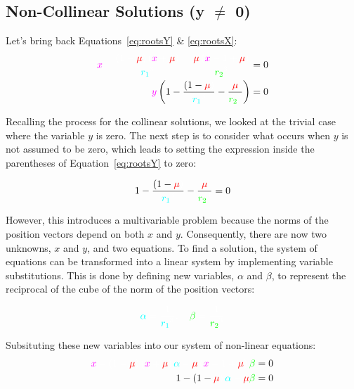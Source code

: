 \subsection{Non-Collinear Solutions \texorpdfstring{(y $\neq$ 0)}{}}

Let's bring back Equations~\eqref{eq:rootsY} \& \eqref{eq:rootsX}:
\begin{align*}
    \cm x \cw - \ddfrac{\left(1 - \cred \mu \cw \right) \left(\cm x \cw + \cred \mu \cw\right)}{\cc r_1 \cw ^3} - \ddfrac{\cred \mu \cw \left(\cm x \cw - 1 + \cred\mu\cw\right)}{\cg r_2 \cw ^3} & = 0
    \\
    \textcolor{magenta}{y} \left( 1 - \ddfrac{\left(1-\cred\mu\cw\right)}{\cc r_1 \cw ^3} - \ddfrac{\cred\mu\cw}{\cg r_2 \cw ^3} \right)                                                          & = 0
\end{align*}


Recalling the process for the collinear solutions, we looked at the trivial case where the variable $y$ is zero. The next step is to consider what occurs when $y$ is not assumed to be zero, which leads to setting the expression inside the parentheses of Equation~\eqref{eq:rootsY} to zero:

\begin{equation}
    1 - \ddfrac{\left(1-\cred\mu\cw\right)}{\cc r_1 \cw ^3} - \ddfrac{\cred\mu\cw}{\cg r_2 \cw ^3} = 0 \\
\end{equation}

However, this introduces a multivariable problem because the norms of the position vectors depend on both $x$ and $y$. Consequently, there are now two unknowns, $x$ and $y$, and two equations. To find a solution, the system of equations can be transformed into a linear system by implementing variable substitutions. This is done by defining new variables, $\alpha$ and $\beta$, to represent the reciprocal of the cube of the norm of the position vectors:

\begin{equation}
    \cc \alpha \cw = \ddfrac{1}{\cc r_1 \cw ^3}, \quad \cg \beta \cw = \ddfrac{1}{\cg r_2 \cw ^3}
\end{equation}

Subsituting these new variables into our system of non-linear equations:
\begin{align}
    \cm x \cw - \left(1 - \cred \mu \cw \right) \left(\cm x \cw + \cred \mu \cw\right) \cc \alpha \cw
    - \cred \mu \cw \left(\cm x \cw - 1 + \cred\mu\cw\right) \cg \beta \cw    & = 0
    \label{eq:eq9}
    \\
    1 - \left(1-\cred\mu\cw\right) \cc \alpha \cw - \cred\mu\cw \cg \beta \cw & = 0
    \label{eq:eq10}
\end{align}

